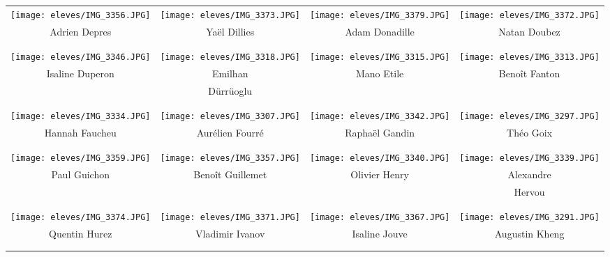 \begin{center}
\begin{tabular}{cccc}
\texttt{[image: eleves/IMG\_3356.JPG]} &
\texttt{[image: eleves/IMG\_3373.JPG]} &
\texttt{[image: eleves/IMG\_3379.JPG]} &
\texttt{[image: eleves/IMG\_3372.JPG]} \\
Adrien Depres & Yaël Dillies & Adam Donadille & Natan Doubez  \\ \\ \\ 

\texttt{[image: eleves/IMG\_3346.JPG]} &
\texttt{[image: eleves/IMG\_3318.JPG]} &
\texttt{[image: eleves/IMG\_3315.JPG]} &
\texttt{[image: eleves/IMG\_3313.JPG]} \\
Isaline Duperon & Emilhan & Mano Etile & Benoît Fanton \\ & Dürrüoglu & &\\ \\ \\ 

\texttt{[image: eleves/IMG\_3334.JPG]} &
\texttt{[image: eleves/IMG\_3307.JPG]} &
\texttt{[image: eleves/IMG\_3342.JPG]} &
\texttt{[image: eleves/IMG\_3297.JPG]} \\
Hannah Faucheu & Aurélien Fourré & Raphaël Gandin & Théo Goix \\ \\ \\ 

\texttt{[image: eleves/IMG\_3359.JPG]} &
\texttt{[image: eleves/IMG\_3357.JPG]} &
\texttt{[image: eleves/IMG\_3340.JPG]} &
\texttt{[image: eleves/IMG\_3339.JPG]} \\
Paul Guichon & Benoît Guillemet & Olivier Henry & Alexandre\\ & & & Hervou \\ \\ \\ 

\texttt{[image: eleves/IMG\_3374.JPG]} &
\texttt{[image: eleves/IMG\_3371.JPG]} &
\texttt{[image: eleves/IMG\_3367.JPG]} &
\texttt{[image: eleves/IMG\_3291.JPG]} \\
Quentin Hurez & Vladimir Ivanov & Isaline Jouve & Augustin Kheng \\ \\ \\ 


\end{tabular}
\end{center}
